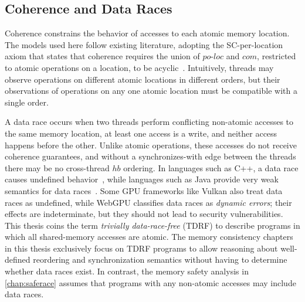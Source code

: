 \subsection{Coherence and Data Races}

Coherence constrains the behavior of accesses to each atomic memory location. The models used here follow existing literature, adopting the SC-per-location axiom that states that coherence requires the union of $\textit{po-loc}$ and $com$, restricted to atomic operations on a location, to be acyclic~\cite{alglave2014herding}. Intuitively, threads may observe operations on different atomic locations in different orders, but their observations of operations on any one atomic location must be compatible with a single order.

A data race occurs when two threads perform conflicting non-atomic accesses to the same memory location, at least one access is a write, and neither access happens before the other. Unlike atomic operations, these accesses do not receive coherence guarantees, and without a synchronizes-with edge between the threads there may be no cross-thread $hb$ ordering. In languages such as C++, a data race causes undefined behavior~\cite{batty2011mathematizing}, while languages such as Java provide very weak semantics for data races~\cite{manson2005java}. Some GPU frameworks like Vulkan also treat data races as undefined, while WebGPU classifies data races as \textit{dynamic errors}; their effects are indeterminate, but they should not lead to security vulnerabilities. This thesis coins the term \textit{trivially data-race-free} (TDRF) to describe programs in which all shared-memory accesses are atomic. The memory consistency chapters in this thesis exclusively focus on TDRF programs to allow reasoning about well-defined reordering and synchronization semantics without having to determine whether data races exist. In contrast, the memory safety analysis in \mychap\ref{chap:saferace} assumes that programs with any non-atomic accesses may include data races.

\newcommand{\iriwlitmustest}{
    \begingroup
    \tagpdfsetup{table/header-rows={1}}
    \begin{tabular}{l l l l}
    \midrule
    \multicolumn{1}{c}{\underline{thread 0}} &
    \multicolumn{1}{c}{\underline{thread 1}} &
    \multicolumn{1}{c}{\underline{thread 2}} &
    \multicolumn{1}{c}{\underline{thread 3}} \\
        \texttt{store(x, 1)} &
        \texttt{store(y, 1)} &
        \texttt{let r0 = load(x)} &
        \texttt{let r2 = load(y)} \\
        & &
        \texttt{fence(acquire)} &
        \texttt{fence(acquire)} \\
        & &
        \texttt{let r1 = load(y)} &
        \texttt{let r3 = load(x)} \\
    \midrule
    \multicolumn{4}{c}{Weak outcome: \texttt{r0 == 1 \&\& r1 == 0 \&\& r2 == 1 \&\& r3 == 0}}
    \end{tabular}
    \endgroup
}

